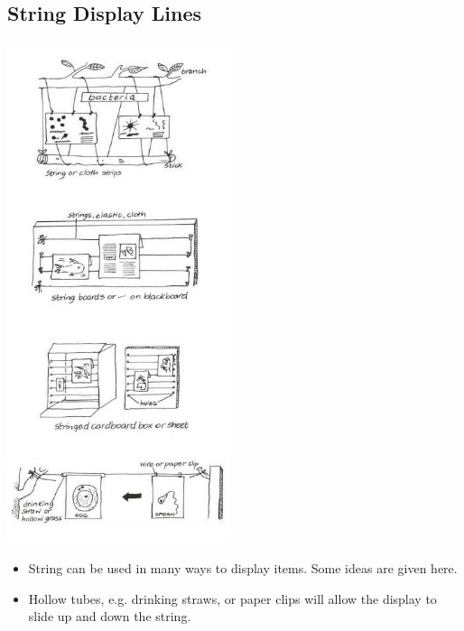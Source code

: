 \begin{multicols}{2}
%

\columnbreak

\subsection{String Display Lines}

\begin{center}
\includegraphics[width=0.49\textwidth]{./img/vso/string-display.jpg}
\end{center}

\begin{itemize}
\item String can be used in many ways to display items. Some ideas are given here.
\item Hollow tubes, e.g. drinking
straws, or paper clips will allow
the display to slide up and
down the string.
\end{itemize}


\end{multicols}
